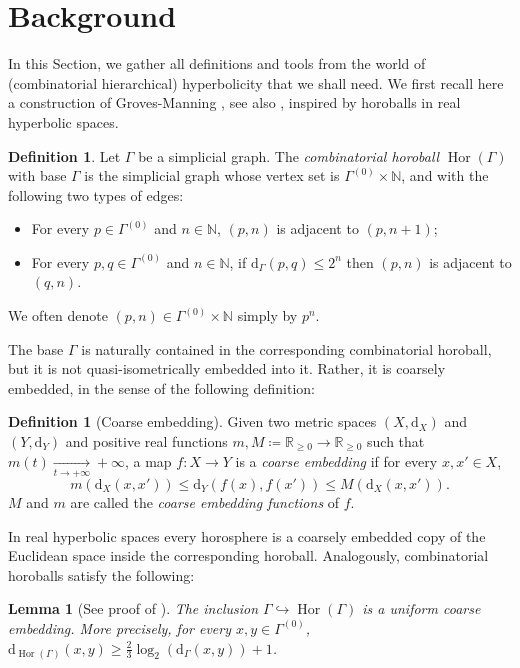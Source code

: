 \documentclass[svgnames]{amsart}
\theoremstyle{plain}
\newtheorem{lem}[thm]{Lemma}
\theoremstyle{definition}
\newtheorem{defn}[thm]{Definition}
\newcommand{\dist}{\mathrm{d}}
\newcommand{\Hor}[1]{\operatorname{Hor}\left(#1\right)}
\newcommand{\N}{\mathbb{N}}
\begin{document}
\section{Background}
\label{sec:background}
In this Section, we gather all definitions and tools from the world of (combinatorial hierarchical) hyperbolicity that we shall need. We first recall here a construction of Groves-Manning \cite{GrovesManning}, see also \cite{Bow-relhyp}, inspired by horoballs in real hyperbolic spaces.

\begin{defn}\label{def:horoball}
Let $\Gamma$ be a simplicial graph. The \emph{combinatorial horoball} $\Hor{\Gamma}$ with base $\Gamma$ is the simplicial graph whose vertex set is $\Gamma^{(0)}\times \N$, and with the following two types of edges:
\begin{itemize}
\item For every $p\in \Gamma^{(0)}$ and $n\in \N$, $(p,n)$ is adjacent to $(p, n+1)$;
\item For every $p,q\in \Gamma^{(0)}$ and $n\in \N$, if $\dist_{\Gamma}(p,q)\le 2^n$ then $(p,n)$ is adjacent to $(q,n)$.
\end{itemize}
We often denote $(p,n)\in \Gamma^{(0)}\times \N$ simply by $p^n$. 
\end{defn}

\noindent The base $\Gamma$ is naturally contained in the corresponding combinatorial horoball, but it is not quasi-isometrically embedded into it. Rather, it is coarsely embedded, in the sense of the following definition:

\begin{defn}[Coarse embedding]\label{def:coarse_emb}
    Given two metric spaces $(X,\dist_X)$ and $(Y,\dist_Y)$ and positive real functions $m,M\coloneq \mathbb{R}_{\ge 0}\to \mathbb{R}_{\ge 0}$ such that $m(t)\xrightarrow[t\to +\infty]{}+\infty$, a map $f\colon X\to Y$ is a \emph{coarse embedding} if for every $x,x'\in X$, $$m\left(\dist_X(x,x')\right)\le \dist_Y(f(x),f(x'))\le M\left(\dist_X(x,x')\right).$$
    $M$ and $m$ are called the \emph{coarse embedding functions} of $f$.
\end{defn}

\noindent In real hyperbolic spaces every horosphere is a coarsely embedded copy of the Euclidean space inside the corresponding horoball. Analogously, combinatorial horoballs satisfy the following:

\begin{lem}[{See proof of \cite[Lemma 3.10]{GrovesManning}}]\label{lem:coarseemb_in_hor}
    The inclusion $\Gamma\hookrightarrow \Hor{\Gamma}$ is a uniform coarse embedding. More precisely, for every $x,y\in \Gamma^{(0)}$, $\dist_{\Hor{\Gamma}}(x,y)\ge \frac{2}{3}\log_{2}(\dist_{\Gamma}(x,y))+1$.
\end{lem}
\end{document}

